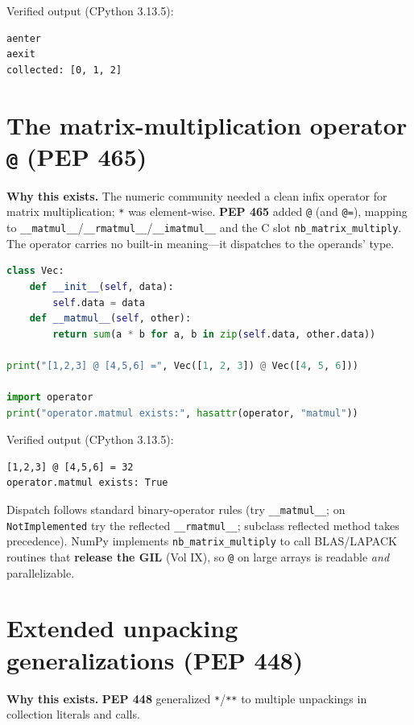 Verified output (CPython 3.13.5):

\begin{lstlisting}[caption={Output}]
aenter
aexit
collected: [0, 1, 2]
\end{lstlisting}

\section{The matrix-multiplication operator \texttt{@} (PEP 465)}

\textbf{Why this exists.} The numeric community needed a clean infix operator for matrix
multiplication; \texttt{*} was element-wise. \textbf{PEP 465} added \texttt{@} (and \texttt{@=}),
mapping to \texttt{\_\_matmul\_\_}/\texttt{\_\_rmatmul\_\_}/\texttt{\_\_imatmul\_\_} and the C slot
\texttt{nb\_matrix\_multiply}. The operator carries no built-in meaning---it dispatches to the
operands' type.

\begin{lstlisting}[language=Python, caption={@ dispatches to \_\_matmul\_\_; here, a vector dot product.}]
class Vec:
    def __init__(self, data):
        self.data = data
    def __matmul__(self, other):
        return sum(a * b for a, b in zip(self.data, other.data))

print("[1,2,3] @ [4,5,6] =", Vec([1, 2, 3]) @ Vec([4, 5, 6]))

import operator
print("operator.matmul exists:", hasattr(operator, "matmul"))
\end{lstlisting}

Verified output (CPython 3.13.5):

\begin{lstlisting}[caption={Output}]
[1,2,3] @ [4,5,6] = 32
operator.matmul exists: True
\end{lstlisting}

Dispatch follows standard binary-operator rules (try \texttt{\_\_matmul\_\_}; on
\texttt{NotImplemented} try the reflected \texttt{\_\_rmatmul\_\_}; subclass reflected method takes
precedence). NumPy implements \texttt{nb\_matrix\_multiply} to call BLAS/LAPACK routines that
\textbf{release the GIL} (Vol IX), so \texttt{@} on large arrays is readable \emph{and}
parallelizable.

\section{Extended unpacking generalizations (PEP 448)}

\textbf{Why this exists.} \textbf{PEP 448} generalized \texttt{*}/\texttt{**} to multiple
unpackings in collection literals and calls.

